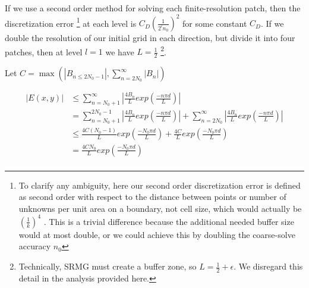 \documentclass[final]{siamart1116}
\numberwithin{theorem}{section}
\begin{document}
If we use a second order method for solving each finite-resolution patch, then the discretization error \footnote{To clarify any ambiguity, here our second order discretization error is defined as second order with respect to the distance between points or number of unknowns per unit area on a boundary, not cell size, which would actually be$(\frac{1}{k})^4$ . This is a trivial difference because the additional needed buffer size would at most double, or we could achieve this by doubling the coarse-solve accuracy $n_0$} at each level is $C_D \left(\frac{1}{2^l n_0}\right)^2$ for some constant $C_D$. If we double the resolution of our initial grid in each direction, but divide it into four patches, then at level $l = 1$ we have $L = \frac{1}{2}$ \footnote{Technically, SRMG must create a buffer zone, so $L = \frac{1}{2} + \epsilon$. We disregard this detail in the analysis provided here. }.



Let $C = \max{(|B_{n \leq 2N_0-1}|, \sum_{n=2N_0}^\infty |B_n|) } $

\begin{align}
  \left|E(x, y)\right| &\leq \sum^{\infty}_{n=N_0+1} |\frac{4 B_n}{L} exp(\frac{-n \pi d}{L})|  \nonumber \\  
& = \sum_{n=N_0+1}^{2N_0-1} |\frac{4B_n}{L} exp(\frac{-n \pi d}{L})| + \sum_{n=2N_0}^{\infty} |\frac{4B_n}{L} exp(\frac{-n \pi d}{L}) |  \nonumber \\
&\leq  \frac{4 C (N_0-1)}{L} exp(\frac{-N_0 \pi d}{L}) + \frac{4C}{L} exp(\frac{-N_0 \pi d}{L} ) \nonumber \\  
&= \frac{4C N_0}{L} exp(\frac{-N_0 \pi d}{L}) \nonumber \label{bound}  \\
\end{align}





\end{document}
